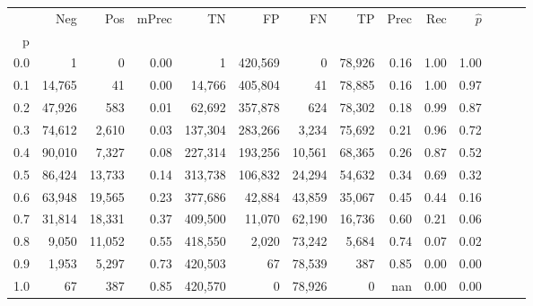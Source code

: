 \begin{tabular}{rrrrrrrrrrrrrr}
\toprule
{} &     Neg &     Pos & mPrec &       TN &       FP &      FN &      TP &  Prec &   Rec & $\hat{p}$ \\
p   &         &         &       &          &          &         &         &       &       &           \\
\midrule
0.0 &       1 &       0 &  0.00 &        1 &  420,569 &       0 &  78,926 &  0.16 &  1.00 &      1.00 \\
0.1 &  14,765 &      41 &  0.00 &   14,766 &  405,804 &      41 &  78,885 &  0.16 &  1.00 &      0.97 \\
0.2 &  47,926 &     583 &  0.01 &   62,692 &  357,878 &     624 &  78,302 &  0.18 &  0.99 &      0.87 \\
0.3 &  74,612 &   2,610 &  0.03 &  137,304 &  283,266 &   3,234 &  75,692 &  0.21 &  0.96 &      0.72 \\
0.4 &  90,010 &   7,327 &  0.08 &  227,314 &  193,256 &  10,561 &  68,365 &  0.26 &  0.87 &      0.52 \\
0.5 &  86,424 &  13,733 &  0.14 &  313,738 &  106,832 &  24,294 &  54,632 &  0.34 &  0.69 &      0.32 \\
0.6 &  63,948 &  19,565 &  0.23 &  377,686 &   42,884 &  43,859 &  35,067 &  0.45 &  0.44 &      0.16 \\
0.7 &  31,814 &  18,331 &  0.37 &  409,500 &   11,070 &  62,190 &  16,736 &  0.60 &  0.21 &      0.06 \\
0.8 &   9,050 &  11,052 &  0.55 &  418,550 &    2,020 &  73,242 &   5,684 &  0.74 &  0.07 &      0.02 \\
0.9 &   1,953 &   5,297 &  0.73 &  420,503 &       67 &  78,539 &     387 &  0.85 &  0.00 &      0.00 \\
1.0 &      67 &     387 &  0.85 &  420,570 &        0 &  78,926 &       0 &   nan &  0.00 &      0.00 \\
\bottomrule
\end{tabular}
